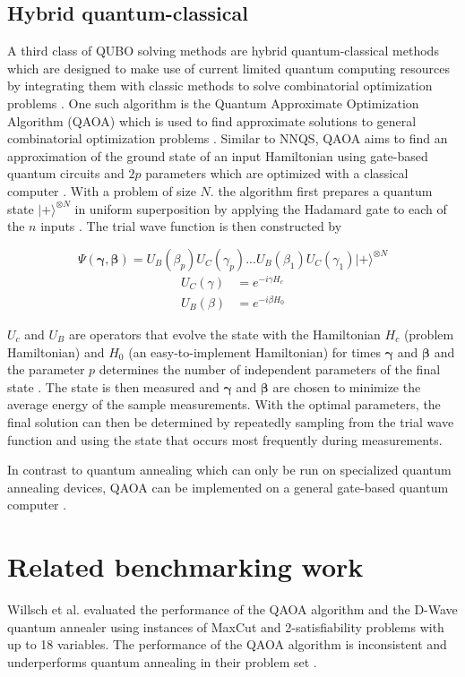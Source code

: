 \subsection{Hybrid quantum-classical}
A third class of QUBO solving methods are hybrid quantum-classical methods which are designed to make use of current limited quantum computing resources by integrating them with classic methods to solve combinatorial optimization problems \cite{b32}. One such algorithm is the Quantum Approximate Optimization Algorithm (QAOA) which is used to find approximate solutions to general combinatorial optimization problems \cite{b23}. Similar to NNQS, QAOA aims to find an approximation of the ground state of an input Hamiltonian using gate-based quantum circuits and $2p$ parameters which are optimized with a classical computer \cite{b34}. With a problem of size $N$. the algorithm first prepares a quantum state $| + \rangle^{\otimes N}$ in uniform superposition by applying the Hadamard gate to each of the $n$ inputs \cite{b34}. The trial wave function is then constructed by

\begin{equation}
    \Psi(\boldsymbol{\gamma}, \boldsymbol{\beta}) = U_B(\beta_p) U_C(\gamma_p)...U_B(\beta_1) U_C(\gamma_1) | + \rangle^{\otimes N}
\end{equation}
\begin{align*}
    U_C(\gamma) &= e^{-i\gamma H_c} \\
    U_B(\beta) &= e^{-i\beta H_0}
\end{align*}

$U_c$ and $U_B$ are operators that evolve the state with the Hamiltonian $H_c$ (problem Hamiltonian) and $H_0$ (an easy-to-implement Hamiltonian) for times $\boldsymbol{\gamma}$ and $\boldsymbol{\beta}$ and the parameter $p$ determines the number of independent parameters of the final state \cite{b34}. The state is then measured and $\boldsymbol{\gamma}$ and $\boldsymbol{\beta}$ are chosen to minimize the average energy of the sample measurements. With the optimal parameters, the final solution can then be determined by repeatedly sampling from the trial wave function and using the state that occurs most frequently during measurements.

In contrast to quantum annealing which can only be run on specialized quantum annealing devices, QAOA can be implemented on a general gate-based quantum computer \cite{b22}. 

\section{Related benchmarking work}
Willsch et al. \cite{b34} evaluated the performance of the QAOA algorithm and the D-Wave quantum annealer using instances of MaxCut and 2-satisfiability problems with up to 18 variables. The performance of the QAOA algorithm is inconsistent and underperforms quantum annealing in their problem set \cite{b34}. 

